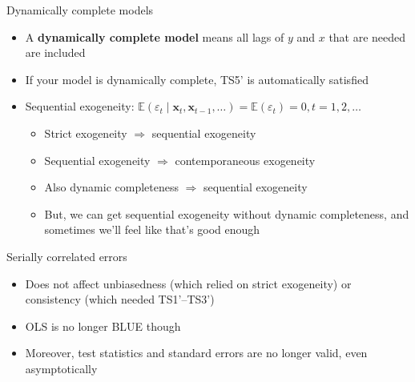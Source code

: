 \documentclass[
  ignorenonframetext,
]{beamer}
\providecommand{\tightlist}{%
  \setlength{\itemsep}{0pt}\setlength{\parskip}{0pt}}
\newcommand{\setsep}{\setlength{\itemsep}{3pt}}
\newcommand{\setskip}{\setlength{\parskip}{3pt}}
\renewcommand{\tightlist}{\setsep\setskip}
\begin{document}
\begin{frame}{Dynamically complete models}
\label{dynamically-complete-models}
\begin{itemize}[<+->]
\tightlist
\item
  A \textbf{dynamically complete model} means all lags of \(y\) and \(x\) that are needed are included
\item
  If your model is dynamically complete, TS5' is automatically satisfied
\item
  Sequential exogeneity: \(\mathbb{E}\left(\varepsilon_t\mid\mathbf{x}_t, \mathbf{x}_{t-1}, \dots\right) = \mathbb{E}\left(\varepsilon_t\right) = 0, t = 1, 2, \dots\)

  \begin{itemize}[<+->]
  \tightlist
  \item
    Strict exogeneity \(\Rightarrow\) sequential exogeneity
  \item
    Sequential exogeneity \(\Rightarrow\) contemporaneous exogeneity
  \item
    Also dynamic completeness \(\Rightarrow\) sequential exogeneity
  \item
    But, we can get sequential exogeneity without dynamic completeness, and sometimes we'll feel like that's good enough
  \end{itemize}
\end{itemize}
\end{frame}

\begin{frame}{Serially correlated errors}
\label{serially-correlated-errors}
\begin{itemize}[<+->]
\tightlist
\item
  Does not affect unbiasedness (which relied on strict exogeneity) or consistency (which needed TS1'--TS3')
\item
  OLS is no longer BLUE though
\item
  Moreover, test statistics and standard errors are no longer valid, even asymptotically
\end{itemize}
\end{frame}
\end{document}
